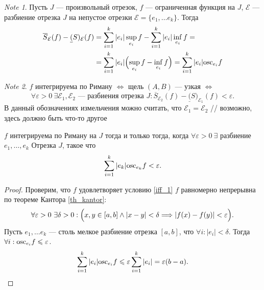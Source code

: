 \documentclass[11pt]{book}
\newcommand{\slim}{\sum\limits}
\newcommand{\osc}{{\mathop{\text{\rm osc}}}}
\renewcommand{\le}{\leqslant}
\theoremstyle{definition}
\theoremstyle{plain}
\theoremstyle{plain}
\theoremstyle{definition}
\theoremstyle{remark}
\newtheorem*{note}{Note}
\begin{document}
\begin{note}
    Пусть $ J$ --- произвольный отрезок, $ f$ --- ограниченная функция на $ J$, $ \mathcal{E}$ --- разбиение отрезка $ J  $ на непустое отрезки $ \mathcal{E} =\{e_1, \ldots  e_k\}$.
    Тогда
    \begin{align*}
	\overline{S}_{\mathcal{E}}(f)  - \underline(S)_{\mathcal{E}}(f) &= \sum_{i=1}^{k} |e_i|\sup_{e_i}f  - \sum_{i=1}^{k}|e_i|\inf_{e_i}f = \\
									&= \sum_{i=1}^{k}|e_i|\Bigl( \sup_{e_i} f - \inf_{e_i}f\Bigr) = \sum_{i=1}^{k} |e_i| \osc_{e_i}f
    \end{align*}
\end{note}
\begin{note}
    $ f$ интегрируема по Риману  $ \Longleftrightarrow $  щель $ (A, B)$ --- узкая $ \Longleftrightarrow $
    \[
	\forall \varepsilon >0 ~ \exists  \mathcal{E}_1, \mathcal{E}_2 \text{ --- разбиения отрезка } J: \overline{S}_{\mathcal{E}_2}(f)  - \underline(S)_{\mathcal{E}_1}(f)  < \varepsilon
    .\]
    В данный обозначениях измельчения можно считать, что $ \mathcal{E}_1 = \mathcal{E}_2$
    // возможно, здесь должно быть что-то другое
\end{note}
\begin{thm}
    $ f$   интегрируема по Риману на $ J$ тогда и только тогда, когда $ \forall  \varepsilon >0 ~ \exists $ разбиение $ e_1, \ldots,  e_k$ Отрезка $ J$, такое что
    \begin{align}
	\slim_{i=1}^{k}|e_k| \osc_{e_k} f < \varepsilon . \label{iff_1}
    \end{align}
\end{thm}
\begin{proof}
    Проверим, что $ f$ удовлетворяет условию  \ref{iff_1}
    $ f$ равномерно непрерывна по теореме Кантора \ref{th_kantor}:
    \[
	\forall		\varepsilon >0 ~ \exists \delta  >0: \Bigl( x, y \in  [a, b] \wedge  |x-y| < \delta  \Longrightarrow  |f(x) - f(y)| < \varepsilon  \Bigr)
    .\]
    Пусть $ e_1, \ldots e_k$ --- столь мелкое разбиение отрезка $ [a, b]$, что $ \forall i: |e_i| < \delta $. Тогда  $ \forall i: \osc_{e_i}f \le \varepsilon $.
    \[
	\sum_{i=1}^{k} |e_i|\osc_{e_i} f \le \varepsilon \sum_{i=1}^{k}|e_i| = \varepsilon (b-a)
    .\]
\end{proof}
\end{document}
